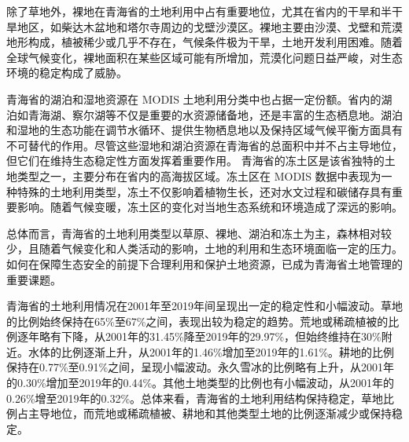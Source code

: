 \documentclass{article}
\begin{document}
		除了草地外，裸地在青海省的土地利用中占有重要地位，尤其在省内的干旱和半干旱地区，如柴达木盆地和塔尔寺周边的戈壁沙漠区。裸地主要由沙漠、戈壁和荒漠地形构成，植被稀少或几乎不存在，气候条件极为干旱，土地开发利用困难。随着全球气候变化，裸地面积在某些区域可能有所增加，荒漠化问题日益严峻，对生态环境的稳定构成了威胁。
		
		青海省的湖泊和湿地资源在 MODIS 土地利用分类中也占据一定份额。省内的湖泊如青海湖、察尔湖等不仅是重要的水资源储备地，还是丰富的生态栖息地。湖泊和湿地的生态功能在调节水循环、提供生物栖息地以及保持区域气候平衡方面具有不可替代的作用。尽管这些湿地和湖泊资源在青海省的总面积中并不占主导地位，但它们在维持生态稳定性方面发挥着重要作用。	
		青海省的冻土区是该省独特的土地类型之一，主要分布在省内的高海拔区域。冻土区在 MODIS 数据中表现为一种特殊的土地利用类型，冻土不仅影响着植物生长，还对水文过程和碳储存具有重要影响。随着气候变暖，冻土区的变化对当地生态系统和环境造成了深远的影响。
		
		总体而言，青海省的土地利用类型以草原、裸地、湖泊和冻土为主，森林相对较少，且随着气候变化和人类活动的影响，土地的利用和生态环境面临一定的压力。如何在保障生态安全的前提下合理利用和保护土地资源，已成为青海省土地管理的重要课题。
		
		青海省的土地利用情况在2001年至2019年间呈现出一定的稳定性和小幅波动。草地的比例始终保持在65\%至67\%之间，表现出较为稳定的趋势。荒地或稀疏植被的比例逐年略有下降，从2001年的31.45\%降至2019年的29.97\%，但始终维持在30\%附近。水体的比例逐渐上升，从2001年的1.46\%增加至2019年的1.61\%。耕地的比例保持在0.77\%至0.91\%之间，呈现小幅波动。永久雪冰的比例略有上升，从2001年的0.30\%增加至2019年的0.44\%。其他土地类型的比例也有小幅波动，从2001年的0.26\%增至2019年的0.32\%。总体来看，青海省的土地利用结构保持稳定，草地比例占主导地位，而荒地或稀疏植被、耕地和其他类型土地的比例逐渐减少或保持稳定。
		
\end{document}
